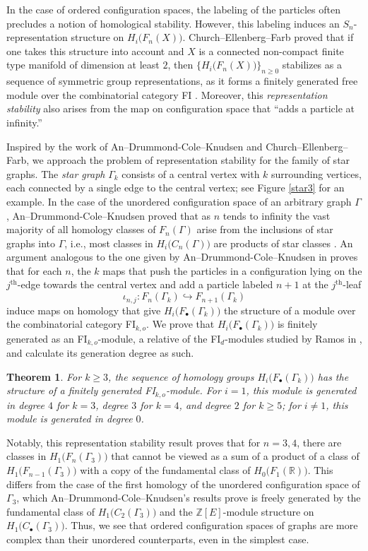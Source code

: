 \documentclass[pagebackref,colorlinks,citecolor=blue,linkcolor=blue,urlcolor=blue,filecolor=blue]{article}
\newtheorem{thm}{Theorem}[section]
\theoremstyle{definition}\newtheorem{definition}[thm]{Definition}
\theoremstyle{definition}
\newcommand{\thmtext}{For $k\ge 3$, the sequence of homology groups $H_{i}\big(F_{\bullet}(\Gamma_{k})\big)$ has the structure of a finitely generated FI$_{k,o}$-module.
For $i=1$, this module is generated in degree $4$ for $k=3$, degree $3$ for $k=4$, and degree $2$ for $k\ge 5$; for $i\neq 1$, this module is generated in degree $0$.}
\newcommand{\Z}{\ensuremath{\mathbb{Z}}}
\newcommand{\R}{\ensuremath{\mathbb{R}}}
\begin{document}
In the case of ordered configuration spaces, the labeling of the particles often precludes a notion of homological stability.
However, this labeling induces an $S_{n}$-representation structure on $H_{i}\big(F_{n}(X)\big)$.
Church--Ellenberg--Farb proved that if one takes this structure into account and $X$ is a connected non-compact finite type manifold of dimension at least $2$, then $\Big\{H_{i}\big(F_{n}(X)\big)\Big\}_{n\ge 0}$ stabilizes as a sequence of symmetric group representations, as it forms a finitely generated free module over the combinatorial category FI \cite[Theorem 6.4.3]{church2015fi}.
Moreover, this \emph{representation stability} also arises from the map on configuration space that ``adds a particle at infinity.''

Inspired by the work of An--Drummond-Cole--Knudsen and Church--Ellenberg--Farb, we approach the problem of representation stability for the family of star graphs.
The \emph{star graph} $\Gamma_{k}$ consists of a central vertex with $k$ surrounding vertices, each connected by a single edge to the central vertex; see Figure \ref{star3} for an example.
In the case of the unordered configuration space of an arbitrary graph $\Gamma$, An--Drummond-Cole--Knudsen proved that as $n$ tends to infinity the vast majority of all homology classes of $F_{n}(\Gamma)$ arise from the inclusions of star graphs into $\Gamma$, i.e., most classes in $H_{i}\big(C_{n}(\Gamma)\big)$ are products of star classes \cite[Theorem 1.1]{an2022asymptotic}.
An argument analogous to the one given by An--Drummond-Cole--Knudsen in \cite{an2020edge} proves that for each $n$, the $k$ maps that push the particles in a configuration lying on the $j^{\text{th}}$-edge towards the central vertex and add a particle labeled $n+1$ at the $j^{\text{th}}$-leaf 
\[
\iota_{n,j}:F_{n}(\Gamma_{k})\hookrightarrow F_{n+1}(\Gamma_{k})
\]
induce maps on homology that give $H_{i}\big(F_{\bullet}(\Gamma_{k})\big)$ the structure of a module over the combinatorial category FI$_{k,o}$.
We prove that $H_{i}\big(F_{\bullet}(\Gamma_{k})\big)$ is finitely generated as an FI$_{k,o}$-module, a relative of the FI$_{d}$-modules studied by Ramos in \cite{ramos2017generalized}, and calculate its generation degree as such.

\begin{thm}\label{rep stability for star}
\thmtext
\end{thm}

Notably, this representation stability result proves that for $n=3,4$, there are classes in $H_{1}\big(F_{n}(\Gamma_{3})\big)$ that cannot be viewed as a sum of a product of a class of $H_{1}\big(F_{n-1}(\Gamma_{3})\big)$ with a copy of the fundamental class of $H_{0}\big(F_{1}(\R)\big)$.
This differs from the case of the first homology of the unordered configuration space of $\Gamma_{3}$, which An--Drummond-Cole--Knudsen's results prove is freely generated by the fundamental class of $H_{1}\big(C_{2}(\Gamma_{3})\big)$ and the $\Z[E]$-module structure on $H_{1}\big(C_{\bullet}(\Gamma_{3})\big)$.
Thus, we see that ordered configuration spaces of graphs are more complex than their unordered counterparts, even in the simplest case.
\end{document}
